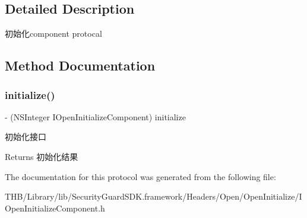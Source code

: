 \subsection{Detailed Description}
初始化component protocal 

\subsection{Method Documentation}
\mbox{\label{protocol_i_open_initialize_component_01-p_a3b5b64201fe4578dd606d576c4bc5733}} 
\subsubsection{\texorpdfstring{initialize()}{initialize()}}
{\footnotesize\ttfamily -\/ (N\+S\+Integer I\+Open\+Initialize\+Component) initialize \begin{DoxyParamCaption}{ }\end{DoxyParamCaption}}

初始化接口

\begin{DoxyReturn}{Returns}
初始化结果 
\end{DoxyReturn}


The documentation for this protocol was generated from the following file\+:\begin{DoxyCompactItemize}
\item 
T\+H\+B/\+Library/lib/\+Security\+Guard\+S\+D\+K.\+framework/\+Headers/\+Open/\+Open\+Initialize/I\+Open\+Initialize\+Component.\+h\end{DoxyCompactItemize}
